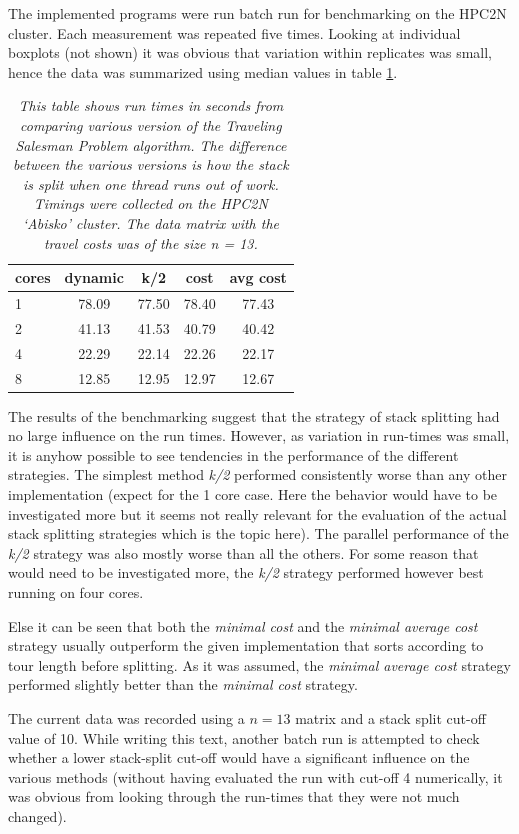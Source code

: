 \documentclass[a4paper,11pt,twoside]{article}
\begin{document}
The implemented programs were run batch run for benchmarking on the HPC2N cluster. Each measurement was repeated five times. Looking at individual boxplots (not shown) it was obvious that variation within replicates was small, hence the data was summarized using median values in table \ref{tab:tsp}.

\begin{table}[]
\centering
\caption{\textit{This table shows run times in seconds from comparing various version of the Traveling Salesman Problem algorithm. The difference between the various versions is how the stack is split when one thread runs out of work. Timings were collected on the HPC2N `Abisko' cluster. The data matrix with the travel costs was of the size n = 13.}}
\label{tab:tsp}
\begin{tabular}{l|cccc}
cores & dynamic & k/2   & cost  & avg cost \\ \hline
1     & 78.09   & 77.50 & 78.40 & 77.43    \\
2     & 41.13   & 41.53 & 40.79 & 40.42    \\
4     & 22.29   & 22.14 & 22.26 & 22.17    \\
8     & 12.85   & 12.95 & 12.97 & 12.67   
\end{tabular}
\end{table}

The results of the benchmarking suggest that the strategy of stack splitting had no large influence on the run times. However, as variation in run-times was small, it is anyhow possible to see tendencies in the performance of the different strategies. The simplest method \textit{k/2} performed consistently worse than any other implementation (expect for the 1 core case. Here the behavior would have to be investigated more but it seems not really relevant for the evaluation of the actual stack splitting strategies which is the topic here). The parallel performance of the \textit{k/2} strategy was also mostly worse than all the others. For some reason that would need to be investigated more, the \textit{k/2} strategy performed however best running on four cores.

Else it can be seen that both the \textit{minimal cost} and the \textit{minimal average cost} strategy usually outperform the given implementation that sorts according to tour length before splitting. As it was assumed, the \textit{minimal average cost} strategy performed slightly better than the \textit{minimal cost} strategy.

The current data was recorded using a $n = 13$ matrix and a stack split cut-off value of 10. While writing this text, another batch run is attempted to check whether a lower stack-split cut-off would have a significant influence on the various methods (without having evaluated the run with cut-off 4 numerically, it was obvious from looking through the run-times that they were not much changed).  
\end{document}
